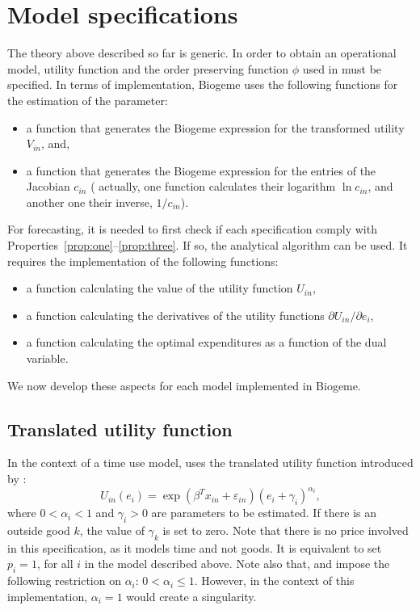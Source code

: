 \documentclass[12pt,a4paper]{article}
\begin{document}
\section{Model specifications}
\label{sec:models}
The theory above described so far is generic. In order to obtain an operational model, utility function and the
order preserving function $\phi$ used in  must be specified.
In terms of implementation, Biogeme uses the following functions for the estimation of the parameter:
\begin{itemize}
    \item a function that generates the Biogeme expression for the transformed utility $V_{in}$, and,
    \item a function that generates the Biogeme expression for the entries of the Jacobian $c_{in}$ (
     actually, one function calculates their logarithm $\ln c_{in}$, and another one their inverse, $1/c_{in}$).
\end{itemize}
For forecasting, it is needed to first check if each specification comply with  Properties~\ref{prop:one}--\ref{prop:three}.
If so, the analytical algorithm can be used. It requires the implementation of the following functions:
\begin{itemize}
    \item a function calculating the value of the utility function $U_{in}$,
    \item a function calculating the derivatives of the utility functions $\partial U_{in}/\partial e_i$,
    \item a function calculating the optimal expenditures  as a function of the dual variable.
\end{itemize}


We now develop these aspects for each model implemented in Biogeme.


\subsection{Translated utility function}
In the context of a time use model,  uses the translated utility function introduced by
:
\begin{equation}
  \label{eq:orig_u}
U_{in}(e_i) = \exp(\beta^T x_{in} + \varepsilon_{in})(e_i + \gamma_i)^{\alpha_i},
\end{equation}
where $0 < \alpha_i < 1$ and $\gamma_i > 0$ are parameters to be
estimated. If there is an outside good $k$, the value of $\gamma_k$ is set to zero.
Note that there is no price involved in this specification,
as it models time and not goods. It is equivalent to set $p_i=1$, for all $i$ in the model
described above. Note also that,
 and  impose
the following restriction on $\alpha_i$: $0 < \alpha_i \leq
1$. However, in the context of this implementation, $\alpha_i=1$ would
create a singularity.
\end{document}
